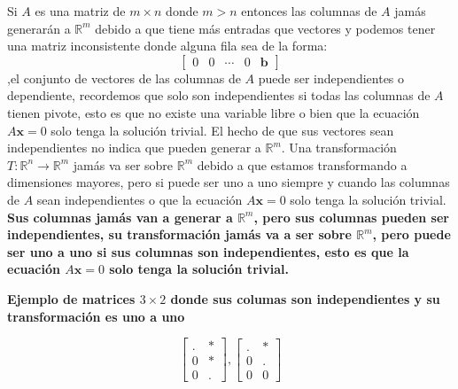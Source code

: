 \documentclass{article}
\begin{document}
\begin{tcolorbox}[colback=red!10!white, colframe=red!70!black, title=Puntos Importantes cuando $m > n$]
    Si $A$ es una matriz de $m \times n$ donde $m > n$ entonces las columnas de $A$ jamás generarán a $\mathbb{R}^m$ debido a que tiene más entradas que vectores y podemos tener una matriz inconsistente donde alguna fila sea de la forma: $$\begin{bmatrix}
        0 & 0 & \dotsb & 0 & \mathbf{b}
    \end{bmatrix}$$,el conjunto de vectores de las columnas de $A$ puede ser independientes o dependiente, recordemos que solo son independientes si todas las columnas de $A$ tienen pivote, esto es que no existe una variable libre o bien que la ecuación $A\mathbf{x} = 0$ solo tenga la solución trivial. El hecho de que sus vectores sean independientes no indica que pueden generar a $\mathbb{R}^m$.
    Una transformación $T: \mathbb{R}^n \rightarrow \mathbb{R}^m$ jamás va ser sobre $\mathbb{R}^m$ debido a que estamos transformando a dimensiones mayores, pero si puede ser uno a uno siempre y cuando las columnas de $A$ sean independientes o que la ecuación $A\mathbf{x} = 0$ solo tenga la solución trivial.\\ 

    \textbf{Sus columnas jamás van a generar a $\mathbb{R}^m$, pero sus columnas pueden ser independientes, su transformación jamás va a ser sobre $\mathbb{R}^m$, pero puede ser uno a uno si sus columnas son independientes, esto es que la ecuación $A\mathbf{x} = 0$ solo tenga la solución trivial.}\\

    \begin{large}
        \textbf{Ejemplo de matrices $3 \times 2$ donde sus columas son independientes y su transformación es uno a uno}
    \end{large}

    \begin{equation*}
        \begin{bmatrix}
            . & *  \\
            0 & * \\
            0 & .
        \end{bmatrix}, 
        \begin{bmatrix}
            . & *  \\
            0 & . \\
            0 & 0
        \end{bmatrix}
    \end{equation*}
    

\end{tcolorbox}
\end{document}
